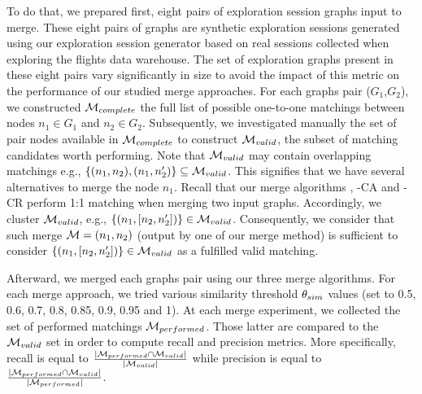 To do that, we prepared first, eight pairs of exploration session graphs input to merge. 
These eight pairs of graphs are synthetic exploration sessions generated using our exploration session generator based on real sessions collected when exploring the flights data warehouse.  The set of exploration graphs present in these eight pairs vary significantly in size to avoid the impact of this metric on the performance of our studied merge approaches.
For each graphs pair ($G_1$,$G_2$), we constructed ${\mathcal M}_{complete}$ the full list of possible one-to-one matchings between nodes $n_1 \in G_1$ and  $n_2 \in G_2$.
Subsequently, we investigated manually the set of pair nodes available in ${\mathcal M}_{complete}$ to construct ${\mathcal M}_{valid}$, the subset of matching candidates worth performing. 
Note that ${\mathcal M}_{valid}$ may contain overlapping matchings e.g., $\{(n_1,n_2), (n_1,n'_2)\} \subseteq {\mathcal M}_{valid}$. This signifies that we have several alternatives to merge the node $n_1$. Recall that our merge algorithms \rlm{}, \mlm{}-CA and \mlm{}-CR perform 1:1 matching when merging two input graphs. Accordingly, we cluster ${\mathcal M}_{valid}$, e.g., $\{(n_1,[n_2,n'_2])\} \in {\mathcal M}_{valid}$. Consequently, we consider that such merge ${\mathcal M}=(n_1,n_2)$ (output by one of our merge method) is sufficient to consider  $\{(n_1,[n_2,n'_2])\} \in {\mathcal M}_{valid}$ as a fulfilled valid matching. 

Afterward, we merged each graphs pair using our three merge algorithms. For each merge approach, we tried various similarity threshold $\theta_{sim}$ values (set to 0.5, 0.6, 0.7, 0.8, 0.85, 0.9, 0.95 and 1). At each merge experiment, we collected the set of performed matchings ${\mathcal M}_{performed}$. Those latter are compared to the ${\mathcal M}_{valid}$ set in order to compute recall and precision metrics. 
More specifically, recall is equal to $\frac{|{\mathcal M}_{performed} \cap {\mathcal M}_{valid}|}{|{\mathcal M}_{valid}|}$ while precision is equal to $\frac{|{\mathcal M}_{performed} \cap {\mathcal M}_{valid}|}{|{\mathcal M}_{performed}|}$.




